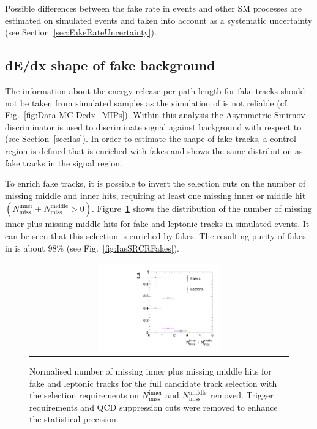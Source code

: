 Possible differences between the fake rate in \Zlep events and other SM processes are estimated on simulated events and taken into account as a systematic uncertainty (see Section~\ref{sec:FakeRateUncertainty}).

\FloatBarrier
\subsection{dE/dx shape of fake background}
The information about the energy release per path length for fake tracks should not be taken from simulated samples as the simulation of \dedx is not reliable (cf. Fig.~\ref{fig:Data-MC-Dedx_MIPs}).
Within this analysis the Asymmetric Smirnov discriminator \ias is used to discriminate signal against background with respect to \dedx (see Section~\ref{sec:Ias}). 
In order to estimate the \ias shape of fake tracks, a control region \fakeCR is defined that is enriched with fakes and shows the same \ias distribution as fake tracks in the signal region.

To enrich fake tracks, it is possible to invert the selection cuts on the number of missing middle and inner hits, \ie requiring at least one missing inner or middle hit $\left( N_{\text{miss}}^{\text{inner}} +N_{\text{miss}}^{\text{middle}}>0\right)$.
Figure~\ref{fig:NMissInnerAndMiddle} shows the distribution of the number of missing inner plus missing middle hits for fake and leptonic tracks in simulated \WJets events.
It can be seen that this selection is enriched by fakes.
The resulting purity of fakes in \fakeCR is about 98\% (see Fig.~\ref{fig:IasSRCRFakes}). 
\begin{figure}[!b]
  \centering 
  \begin{tabular}{c}
    \includegraphics[width=0.49\textwidth]{figures/analysis/Background/NLostInnerPlusMiddleForAllBkg_chiTracksQCDsupressionTrigger.pdf}
  \end{tabular}
  \caption{Normalised number of missing inner plus missing middle hits for fake and leptonic tracks for the full candidate track selection with the selection requirements on $N_{\text{miss}}^{\text{inner}}$ and $N_{\text{miss}}^{\text{middle}}$ removed. Trigger requirements and QCD suppression cuts were removed to enhance the statistical precision.}
  \label{fig:NMissInnerAndMiddle}
\end{figure}

